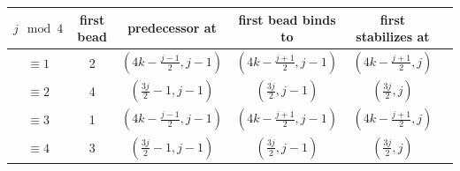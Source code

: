\begin{center}
	\begin{tabular}{|c|c|c|c|c|@{}m{0pt}@{}}
	$j\mod 4$					& first bead 	& predecessor at		& first bead binds to		& first stabilizes at\\
						\hline
	$\equiv 1$	& 2		& $(4k-\frac{j-1}{2}, j-1)$		& $(4k-\frac{j+1}{2}, j-1)$	& $(4k-\frac{j+1}{2}, j)$& $\mathrm{ }$\newline $\mathrm{ }$\\
	\hline
	$\equiv 2$	& 4				& $(\frac{3j}{2}-1,j-1)$		& $(\frac{3j}{2},j-1)$		& $(\frac{3j}{2},j)$ & $\mathrm{ }$\newline $\mathrm{ }$\\
	\hline
	$\equiv 3$	& 1				& $(4k-\frac{j-1}{2}, j-1)$		& $(4k-\frac{j+1}{2}, j-1)$	& $(4k-\frac{j+1}{2}, j)$ & $\mathrm{ }$\newline $\mathrm{ }$ \\
	\hline
	$\equiv 4$	& 3				& $(\frac{3j}{2}-1,j-1)$		& $(\frac{3j}{2},j-1)$		& $(\frac{3j}{2},j)$ & $\mathrm{ }$\newline $\mathrm{ }$ \\
	\hline		
	\end{tabular}
\end{center}






